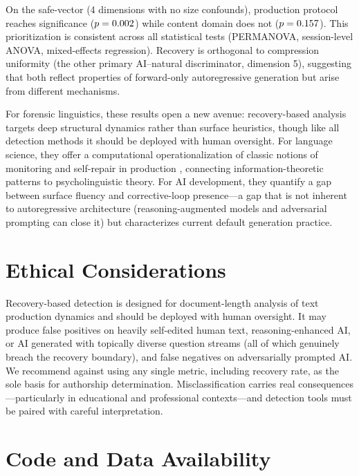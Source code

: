\documentclass[11pt]{article}
\begin{document}
On the safe-vector (4 dimensions with no size confounds), production protocol reaches significance ($p = 0.002$) while content domain does not ($p = 0.157$). This prioritization is consistent across all statistical tests (PERMANOVA, session-level ANOVA, mixed-effects regression). Recovery is orthogonal to compression uniformity (the other primary AI--natural discriminator, dimension 5), suggesting that both reflect properties of forward-only autoregressive generation but arise from different mechanisms.

For forensic linguistics, these results open a new avenue: recovery-based analysis targets deep structural dynamics rather than surface heuristics, though like all detection methods it should be deployed with human oversight. For language science, they offer a computational operationalization of classic notions of monitoring and self-repair in production \citep{levelt1983monitoring}, connecting information-theoretic patterns to psycholinguistic theory. For AI development, they quantify a gap between surface fluency and corrective-loop presence---a gap that is not inherent to autoregressive architecture (reasoning-augmented models and adversarial prompting can close it) but characterizes current default generation practice.


\section*{Ethical Considerations}

Recovery-based detection is designed for document-length analysis of text production dynamics and should be deployed with human oversight. It may produce false positives on heavily self-edited human text, reasoning-enhanced AI, or AI generated with topically diverse question streams (all of which genuinely breach the recovery boundary), and false negatives on adversarially prompted AI. We recommend against using any single metric, including recovery rate, as the sole basis for authorship determination. Misclassification carries real consequences---particularly in educational and professional contexts---and detection tools must be paired with careful interpretation.

\section*{Code and Data Availability}
\end{document}
